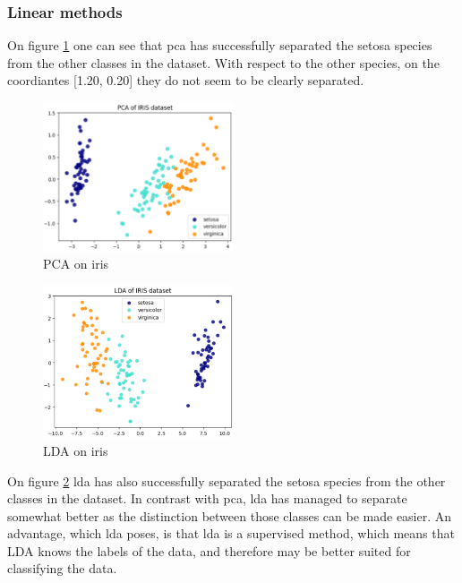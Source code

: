 \subsubsection{Linear methods}\label{subsubsec:linear-methods-on-iris}
On figure \ref{fig:iris-pca} one can see that \gls{pca} has successfully separated the setosa species from the other classes in the dataset. With respect to the other species, on the coordiantes [1.20, 0.20] they do not seem to be clearly separated.

\begin{figure}[htb!]
\centering
\includegraphics[width=0.5\textwidth]{figures/theory-example-figures/iris-pca.png}
\caption{PCA on iris}
\label{fig:iris-pca}
\end{figure}


\begin{figure}[htb!]
    \centering
    \includegraphics[width=0.5\textwidth]{figures/theory-example-figures/iris-lda.png}
    \caption{LDA on iris}
    \label{fig:iris-lda}
    \end{figure}
    
On figure \ref{fig:iris-lda} \gls{lda} has also successfully separated the setosa species from the other classes in the dataset. In contrast with \gls{pca}, \gls{lda} has managed to separate somewhat better as the distinction between those classes can be made easier. An advantage, which \gls{lda} poses, is that \gls{lda} is a supervised method, which means that LDA knows the labels of the data, and therefore may be better suited for classifying the data.

